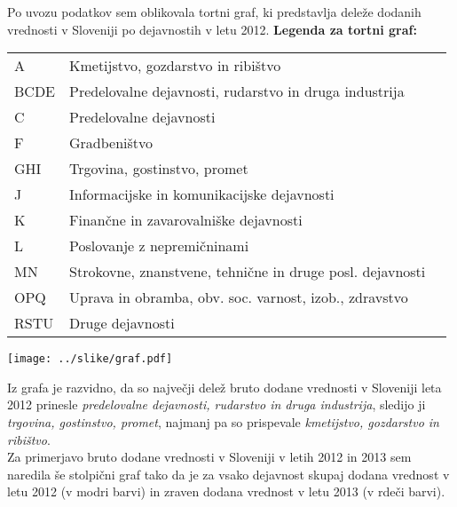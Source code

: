 \documentclass[a4paper, 11pt]{article}
\begin{document}
Po uvozu podatkov sem oblikovala tortni graf, ki predstavlja deleže dodanih vrednosti v Sloveniji po dejavnostih v letu 2012.
\newpage
\textbf{Legenda za tortni graf:}
\begin{table}[h]
\begin{tabular}{lll}
A & Kmetijstvo, gozdarstvo in ribištvo \\
BCDE & Predelovalne dejavnosti, rudarstvo in druga industrija \\
C & Predelovalne dejavnosti \\
F & Gradbeništvo \\
GHI & Trgovina, gostinstvo, promet \\
J & Informacijske in komunikacijske dejavnosti\\
K & Finančne in zavarovalniške dejavnosti\\
L & Poslovanje z nepremičninami \\
MN & Strokovne, znanstvene, tehnične in druge posl. dejavnosti \\
OPQ & Uprava in obramba, obv. soc. varnost, izob., zdravstvo \\
RSTU & Druge dejavnosti
\end{tabular}
\end{table}

\begin{center}
\texttt{[image: ../slike/graf.pdf]}
\end{center}


Iz grafa je razvidno, da so največji delež bruto dodane vrednosti v Sloveniji leta 2012 prinesle \textit{predelovalne dejavnosti, rudarstvo in druga industrija}, sledijo ji \textit{trgovina, gostinstvo, promet}, najmanj pa so prispevale \textit{kmetijstvo, gozdarstvo in ribištvo}.\\




Za primerjavo bruto dodane vrednosti v Sloveniji v letih 2012 in 2013 sem naredila še stolpični graf tako da je za vsako dejavnost skupaj dodana vrednost v letu 2012 (v  modri barvi) in zraven dodana vrednost v letu 2013 (v rdeči barvi).\\
\end{document}
